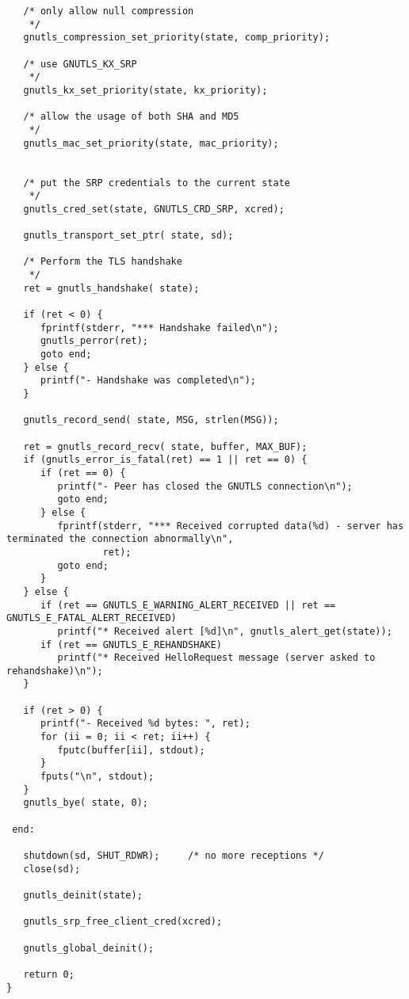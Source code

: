 \begin{verbatim}
   /* only allow null compression
    */
   gnutls_compression_set_priority(state, comp_priority);
 
   /* use GNUTLS_KX_SRP
    */
   gnutls_kx_set_priority(state, kx_priority);
 
   /* allow the usage of both SHA and MD5
    */
   gnutls_mac_set_priority(state, mac_priority);


   /* put the SRP credentials to the current state
    */
   gnutls_cred_set(state, GNUTLS_CRD_SRP, xcred);

   gnutls_transport_set_ptr( state, sd);

   /* Perform the TLS handshake
    */
   ret = gnutls_handshake( state);

   if (ret < 0) {
      fprintf(stderr, "*** Handshake failed\n");
      gnutls_perror(ret);
      goto end;
   } else {
      printf("- Handshake was completed\n");
   }

   gnutls_record_send( state, MSG, strlen(MSG));

   ret = gnutls_record_recv( state, buffer, MAX_BUF);
   if (gnutls_error_is_fatal(ret) == 1 || ret == 0) {
      if (ret == 0) {
         printf("- Peer has closed the GNUTLS connection\n");
         goto end;
      } else {
         fprintf(stderr, "*** Received corrupted data(%d) - server has terminated the connection abnormally\n",
                 ret);
         goto end;
      }
   } else {
      if (ret == GNUTLS_E_WARNING_ALERT_RECEIVED || ret == GNUTLS_E_FATAL_ALERT_RECEIVED)
         printf("* Received alert [%d]\n", gnutls_alert_get(state));
      if (ret == GNUTLS_E_REHANDSHAKE)
         printf("* Received HelloRequest message (server asked to rehandshake)\n");
   }

   if (ret > 0) {
      printf("- Received %d bytes: ", ret);
      for (ii = 0; ii < ret; ii++) {
         fputc(buffer[ii], stdout);
      }
      fputs("\n", stdout);
   }
   gnutls_bye( state, 0);

 end:

   shutdown(sd, SHUT_RDWR);     /* no more receptions */
   close(sd);

   gnutls_deinit(state);

   gnutls_srp_free_client_cred(xcred);

   gnutls_global_deinit();

   return 0;
}

\end{verbatim}
